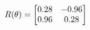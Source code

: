\documentclass[preview]{standalone}
\begin{document}
\begin{align*}
\special{dvisvgm:raw <g id='unique000'>}R(\theta) = \begin{bmatrix}0.28 & -0.96\\0.96 & 0.28\end{bmatrix}\special{dvisvgm:raw </g>}
\end{align*}
\end{document}
